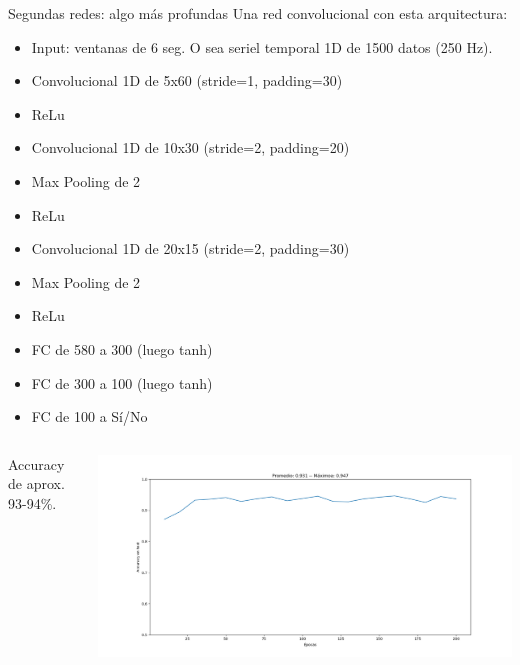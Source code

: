 \documentclass[presentation,9pt]{beamer}
\begin{document}
\begin{frame}{Segundas redes: algo más profundas}
	Una red convolucional con esta arquitectura:
	\begin{itemize}
		\item Input: ventanas de 6 seg. O sea seriel temporal 1D de 1500 datos (250 Hz).
		\item Convolucional 1D de 5x60 (stride=1, padding=30)
		\item ReLu
		\item Convolucional 1D de 10x30 (stride=2, padding=20)
		\item Max Pooling de 2
		\item ReLu 
		\item Convolucional 1D de 20x15 (stride=2, padding=30)
		\item Max Pooling de 2
		\item ReLu
		\item FC de 580 a 300 (luego tanh)
		\item FC de 300 a 100 (luego tanh)
		\item FC de 100 a Sí/No
	\end{itemize}

	\begin{columns}
	Accuracy de aprox. 93-94\%.
		
			\includegraphics[width=.9\textwidth]{./cnn_v7_ball.png}
		
	\end{columns}	

\end{frame}
\end{document}
